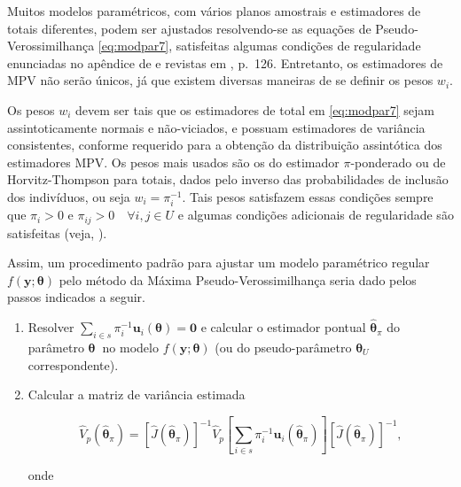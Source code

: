 \documentclass[]{book}
\theoremstyle{definition}
\theoremstyle{definition}
\theoremstyle{definition}
\theoremstyle{remark}
\begin{document}
Muitos modelos paramétricos, com vários planos amostrais e estimadores
de totais diferentes, podem ser ajustados resolvendo-se as equações de
Pseudo-Verossimilhança \eqref{eq:modpar7}, satisfeitas algumas condições
de regularidade enunciadas no apêndice de \citep{binder83} e revistas em
\citep{Silva}, p.~126. Entretanto, os estimadores de MPV não serão
únicos, já que existem diversas maneiras de se definir os pesos
\(w_{i}\).

Os pesos \(w_{i}\) devem ser tais que os estimadores de total em
\eqref{eq:modpar7} sejam assintoticamente normais e não-viciados, e
possuam estimadores de variância consistentes, conforme requerido para a
obtenção da distribuição assintótica dos estimadores MPV. Os pesos mais
usados são os do estimador \(\pi\)-ponderado ou de Horvitz-Thompson para
totais, dados pelo inverso das probabilidades de inclusão dos
indivíduos, ou seja \(w_{i}=\pi _{i}^{-1}\). Tais pesos satisfazem essas
condições sempre que \(\pi _{i}>0\) e
\(\pi _{ij}>0\quad \forall i,j\in U\) e algumas condições adicionais de
regularidade são satisfeitas (veja, \citep{fuller84}).

Assim, um procedimento padrão para ajustar um modelo paramétrico regular
\(f\left( \mathbf{y};\mathbf{\theta }\right)\) pelo método da Máxima
Pseudo-Verossimilhança seria dado pelos passos indicados a seguir.

\begin{enumerate}
\def\labelenumi{\arabic{enumi}.}
\item
  Resolver
  \(\sum\limits_{i\in s}\pi _{i}^{-1}\mathbf{u}_{i}\left( \mathbf{\theta }\right) =\mathbf{0}\)
  e calcular o estimador pontual \(\mathbf{ \hat{\theta}}_{\pi }\) do
  parâmetro \(\mathbf{\theta }\)\textbf{\ }no modelo
  \(f\left( \mathbf{y;\theta }\right)\) (ou do pseudo-parâmetro
  \(\mathbf{\theta }_{U}\) correspondente).
\item
  Calcular a matriz de variância estimada

  \begin{equation}
  \hat{V}_{p}\left( \mathbf{\hat{\theta}}_{\pi }\right) =\left[ \hat{J}\left( 
  \mathbf{\hat{\theta}}_{\pi }\right) \right] ^{-1}\hat{V}_{p}\left[
  \sum\limits_{i\in s}\pi _{i}^{-1}\mathbf{u}_{i}\left( \mathbf{\hat{\theta}}
  _{\pi }\right) \right] \left[ \hat{J}\left( \mathbf{\hat{\theta}}_{\pi
  }\right) \right] ^{-1},  
  \label{eq:modpar13}
  \end{equation}

  onde
\end{enumerate}
\end{document}

